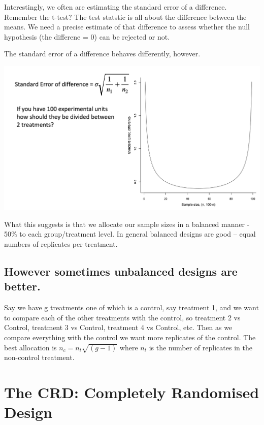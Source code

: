 \documentclass[
]{book}
\begin{document}
Interestingly, we often are estimating the standard error of a difference. Remember the t-test? The test statstic is all about the difference between the means. We need a precise estimate of that difference to assess whether the null hypothesis (the differene = 0) can be rejected or not.

The standard error of a difference behaves differently, however.

\includegraphics[width=36.08in]{images/SE2}

What this suggests is that we allocate our sample sizes in a balanced manner - 50\% to each group/treatment level. In general balanced designs are good -- equal numbers of replicates per treatment.

\hypertarget{however-sometimes-unbalanced-designs-are-better.}{%
\subsection{However sometimes unbalanced designs are better.}\label{however-sometimes-unbalanced-designs-are-better.}}

Say we have g treatments one of which is a control, say treatment 1, and we want to compare each of the other treatments with the control, so treatment 2 vs Control, treatment 3 vs Control, treatment 4 vs Control, etc. Then as we compare everything with the control we want more replicates of the control. The best allocation is \(n_{c} = n_{t}\sqrt{(g-1)}\)
where \(n_{t}\) is the number of replicates in the non-control treatment.

\hypertarget{the-crd-completely-randomised-design}{%
\section{The CRD: Completely Randomised Design}\label{the-crd-completely-randomised-design}}
\end{document}
